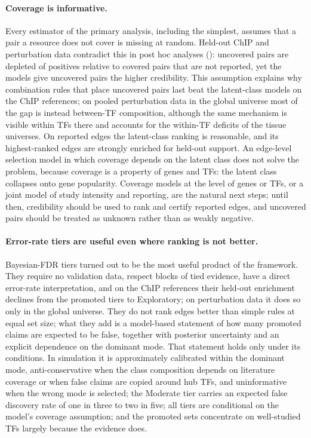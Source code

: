 \documentclass[11pt,a4paper]{article}
\begin{document}
\paragraph{Coverage is informative.}
Every estimator of the primary analysis, including the simplest, assumes that a pair a resource does not cover is missing at random.
Held-out ChIP and perturbation data contradict this in post hoc analyses (): uncovered pairs are depleted of positives relative to covered pairs that are not reported, yet the models give uncovered pairs the higher credibility.
This assumption explains why combination rules that place uncovered pairs last beat the latent-class models on the ChIP references; on pooled perturbation data in the global universe most of the gap is instead between-TF composition, although the same mechanism is visible within TFs there and accounts for the within-TF deficits of the tissue universes.
On reported edges the latent-class ranking is reasonable, and its highest-ranked edges are strongly enriched for held-out support.
An edge-level selection model in which coverage depends on the latent class does not solve the problem, because coverage is a property of genes and TFs: the latent class collapses onto gene popularity.
Coverage models at the level of genes or TFs, or a joint model of study intensity and reporting, are the natural next steps; until then, credibility should be used to rank and certify reported edges, and uncovered pairs should be treated as unknown rather than as weakly negative.

\paragraph{Error-rate tiers are useful even where ranking is not better.}
Bayesian-FDR tiers turned out to be the most useful product of the framework.
They require no validation data, respect blocks of tied evidence, have a direct error-rate interpretation, and on the ChIP references their held-out enrichment declines from the promoted tiers to Exploratory; on perturbation data it does so only in the global universe.
They do not rank edges better than simple rules at equal set size; what they add is a model-based statement of how many promoted claims are expected to be false, together with posterior uncertainty and an explicit dependence on the dominant mode.
That statement holds only under its conditions.
In simulation it is approximately calibrated within the dominant mode, anti-conservative when the class composition depends on literature coverage or when false claims are copied around hub TFs, and uninformative when the wrong mode is selected; the Moderate tier carries an expected false discovery rate of one in three to two in five; all tiers are conditional on the model's coverage assumption; and the promoted sets concentrate on well-studied TFs largely because the evidence does.
\end{document}
